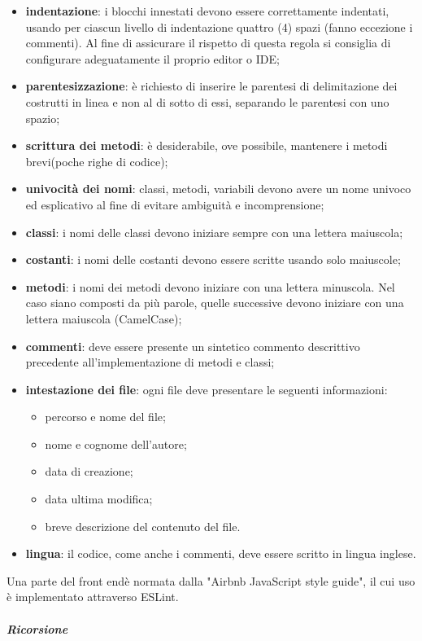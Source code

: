 	\begin{itemize}
		\item \textbf{indentazione}: i blocchi innestati devono essere correttamente 
			indentati, usando per ciascun livello di indentazione quattro (4) spazi (fanno 
			eccezione i commenti). Al fine di assicurare il rispetto di questa regola si 
			consiglia di configurare adeguatamente il proprio editor o IDE;
		\item \textbf{parentesizzazione}: è richiesto di inserire le parentesi di delimitazione dei costrutti in linea e non al di sotto di essi, separando le parentesi con uno spazio;
		\item \textbf{scrittura dei metodi}: è desiderabile, ove possibile, 
			mantenere i metodi brevi(poche righe di codice);
		\item \textbf{univocità dei nomi}: classi, metodi, variabili devono avere un 
			nome univoco	ed esplicativo al fine di evitare ambiguità e incomprensione;
		\item \textbf{classi}: i nomi delle classi devono iniziare sempre con una 
			lettera maiuscola;		
		\item \textbf{costanti}: i nomi delle costanti devono essere scritte usando 
			solo maiuscole;
		\item \textbf{metodi}: i nomi dei metodi devono iniziare con una lettera 
			minuscola. Nel caso siano composti da più parole, quelle successive devono iniziare con una 
			lettera maiuscola (CamelCase\glo{});
		\item \textbf{commenti}: deve essere presente un sintetico commento descrittivo precedente all'implementazione di metodi e classi;
		\item \textbf{intestazione dei file}: ogni file deve presentare le seguenti informazioni:
			\begin{itemize}
				\item percorso e nome del file;
				\item nome e cognome dell'autore;
				\item data di creazione;
				\item data ultima modifica;
				\item breve descrizione del contenuto del file.
			\end{itemize}
		\item \textbf{lingua}: il codice, come anche i commenti, deve essere scritto 
			in lingua inglese.
	\end{itemize}
Una parte del front end\glosp è normata dalla "Airbnb JavaScript style 
guide", il cui uso è implementato attraverso ESLint\glo. \newline \newline
\subparagraph{Ricorsione}  \mbox{}\\

